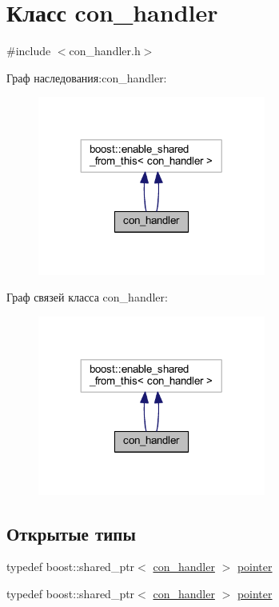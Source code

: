 \hypertarget{classcon__handler}{}\section{Класс con\+\_\+handler}
\label{classcon__handler}


{\ttfamily \#include $<$con\+\_\+handler.\+h$>$}



Граф наследования\+:con\+\_\+handler\+:
\nopagebreak
\begin{figure}[H]
\begin{center}
\leavevmode
\includegraphics[width=212pt]{classcon__handler__inherit__graph}
\end{center}
\end{figure}


Граф связей класса con\+\_\+handler\+:
\nopagebreak
\begin{figure}[H]
\begin{center}
\leavevmode
\includegraphics[width=212pt]{classcon__handler__coll__graph}
\end{center}
\end{figure}
\subsection*{Открытые типы}
\begin{DoxyCompactItemize}
\item 
typedef boost\+::shared\+\_\+ptr$<$ \mbox{\hyperlink{classcon__handler}{con\+\_\+handler}} $>$ \mbox{\hyperlink{classcon__handler_ada4a1b970f9fd8e55460a58cf7f7ce2c}{pointer}}
\item 
typedef boost\+::shared\+\_\+ptr$<$ \mbox{\hyperlink{classcon__handler}{con\+\_\+handler}} $>$ \mbox{\hyperlink{classcon__handler_ada4a1b970f9fd8e55460a58cf7f7ce2c}{pointer}}
\end{DoxyCompactItemize}
